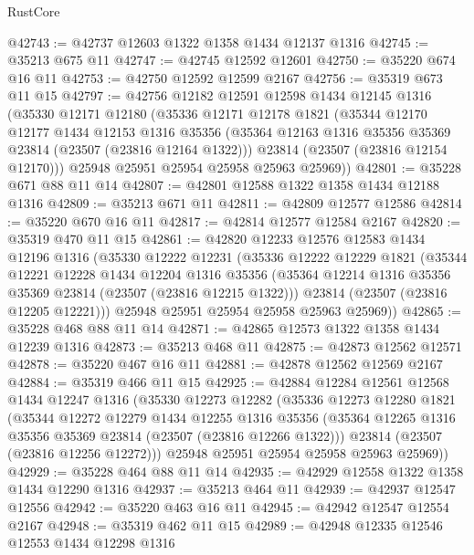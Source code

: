 \begin{lexlean}{RustCore}
\begin{coremodule}
@42743 := @42737 @12603 @1322 @1358 @1434 @12137 @1316
@42745 := @35213 @675 @11
@42747 := @42745 @12592 @12601
@42750 := @35220 @674 @16 @11
@42753 := @42750 @12592 @12599 @2167
@42756 := @35319 @673 @11 @15
@42797 := @42756
    @12182
    @12591
    @12598
    @1434
    @12145
    @1316
    (@35330
      @12171
      @12180
      (@35336
        @12171
        @12178
        @1821
        (@35344
          @12170
          @12177
          @1434
          @12153
          @1316
          @35356
          (@35364 @12163 @1316 @35356 @35369 @23814 (@23507 (@23816 @12164 @1322)))
          @23814
          (@23507 (@23816 @12154 @12170)))
        @25948
        @25951
        @25954
        @25958
        @25963
        @25969))
@42801 := @35228 @671 @88 @11 @14
@42807 := @42801 @12588 @1322 @1358 @1434 @12188 @1316
@42809 := @35213 @671 @11
@42811 := @42809 @12577 @12586
@42814 := @35220 @670 @16 @11
@42817 := @42814 @12577 @12584 @2167
@42820 := @35319 @470 @11 @15
@42861 := @42820
    @12233
    @12576
    @12583
    @1434
    @12196
    @1316
    (@35330
      @12222
      @12231
      (@35336
        @12222
        @12229
        @1821
        (@35344
          @12221
          @12228
          @1434
          @12204
          @1316
          @35356
          (@35364 @12214 @1316 @35356 @35369 @23814 (@23507 (@23816 @12215 @1322)))
          @23814
          (@23507 (@23816 @12205 @12221)))
        @25948
        @25951
        @25954
        @25958
        @25963
        @25969))
@42865 := @35228 @468 @88 @11 @14
@42871 := @42865 @12573 @1322 @1358 @1434 @12239 @1316
@42873 := @35213 @468 @11
@42875 := @42873 @12562 @12571
@42878 := @35220 @467 @16 @11
@42881 := @42878 @12562 @12569 @2167
@42884 := @35319 @466 @11 @15
@42925 := @42884
    @12284
    @12561
    @12568
    @1434
    @12247
    @1316
    (@35330
      @12273
      @12282
      (@35336
        @12273
        @12280
        @1821
        (@35344
          @12272
          @12279
          @1434
          @12255
          @1316
          @35356
          (@35364 @12265 @1316 @35356 @35369 @23814 (@23507 (@23816 @12266 @1322)))
          @23814
          (@23507 (@23816 @12256 @12272)))
        @25948
        @25951
        @25954
        @25958
        @25963
        @25969))
@42929 := @35228 @464 @88 @11 @14
@42935 := @42929 @12558 @1322 @1358 @1434 @12290 @1316
@42937 := @35213 @464 @11
@42939 := @42937 @12547 @12556
@42942 := @35220 @463 @16 @11
@42945 := @42942 @12547 @12554 @2167
@42948 := @35319 @462 @11 @15
@42989 := @42948
    @12335
    @12546
    @12553
    @1434
    @12298
    @1316

\end{coremodule}
\end{lexlean}

